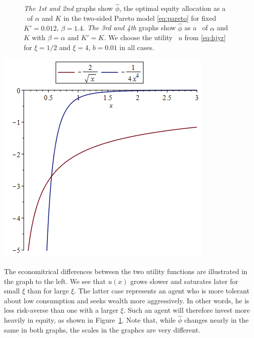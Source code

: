 \begin{figure}[htb!]
\begin{minipage}{0.25\linewidth}
  \end{minipage}
 \caption{
   {\em The 1st and 2nd} graphs show $\hat\phi$, the optimal equity
   allocation as a \fct\ of $\alpha$ and $K$ in the two-sided Pareto model
   \eqref{eq:pareto} for fixed $K'=0.012$, $\beta = 1.4$.
   {\em The 3rd and 4th} graphs show $\hat\phi$ as a \fct\ of $\alpha$
   and $K$ with $\beta = \alpha$ and $K' = K$.
   We choose the utility \fct\ $u$ from \eqref{eq:hjyr} for $\xi = 1/2$
   and $\xi = 4$, $b = 0.01$ in all cases.
  }
  \label{fig:phi_hat_pareto}
\end{figure}

\begin{minipage}{0.5\linewidth}
  \includegraphics[width=\textwidth]{power_utilities.png}
\end{minipage}\hfill
\begin{minipage}{0.42\textwidth}
  The economitrical differences between the two utility functions
  are illustrated in the graph to the left.
  We see that
  $u(x)$ grows slower and saturates later for small $\xi$ than for
  large $\xi$. The latter case represents an agent who is more
  tolerant about low consumption and seeks wealth more
  aggressively. In other words, he is less risk-averse than one with a
  larger $\xi$. Such an agent will therefore invest more heavily in
  equity, as shown in Figure~\ref{fig:phi_hat_pareto}. Note that,
  while $\hat \phi$ changes nearly in the same in both graphs, the
  scales in the graphcs are very different.
\end{minipage}

